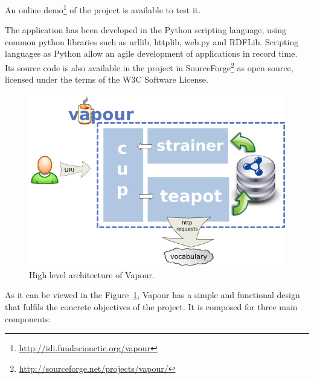 An online demo\footnote{\url{http://idi.fundacionctic.org/vapour}} of the project
is available to test it.

The application has been developed in the Python scripting language, using common
python libraries such as urllib, httplib, web.py and RDFLib. Scripting languages as
Python allow an agile development of applications in record time. Its source code 
is also available in the project in SourceForge\footnote{\url{http://sourceforge.net/projects/vapour/}} 
as open source, licensed under the terms of the W3C Software License.

\begin{figure}
 \centering
 \includegraphics[width=12cm]{images/arch.png}
 \caption{\label{fig:arch}High level architecture of Vapour.}
\end{figure}

As it can be viewed in the Figure~\ref{fig:arch}, Vapour has a simple and functional
design that fulfils the concrete objectives of the project. It is composed for three
main components:

